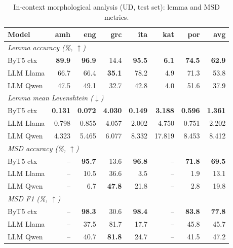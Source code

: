 \begin{table}[h]
\centering
\small
\setlength{\tabcolsep}{5pt}
\renewcommand{\arraystretch}{1.10}
\begin{tabular}{lrrrrrrr}
\toprule
Model & amh & eng & grc & ita & kat & por & avg \\
\midrule
\multicolumn{8}{l}{\textit{Lemma accuracy (\%, $\uparrow$)}} \\
ByT5 ctx & \textbf{89.9} & \textbf{96.9} & 14.4 & \textbf{95.5} & \textbf{6.1} & \textbf{74.5} & \textbf{62.9} \\
LLM Llama & 66.7 & 66.4 & \textbf{35.1} & 78.2 & 4.9 & 71.3 & 53.8 \\
LLM Qwen & 47.5 & 49.1 & 32.7 & 42.8 & 4.0 & 51.6 & 37.9 \\
\midrule
\multicolumn{8}{l}{\textit{Lemma mean Levenshtein ($\downarrow$)}} \\
ByT5 ctx & \textbf{0.131} & \textbf{0.072} & \textbf{4.030} & \textbf{0.149} & \textbf{3.188} & \textbf{0.596} & \textbf{1.361} \\
LLM Llama & 0.798 & 0.855 & 4.057 & 2.002 & 4.750 & 0.751 & 2.202 \\
LLM Qwen & 4.323 & 5.465 & 6.077 & 8.332 & 17.819 & 8.453 & 8.412 \\
\midrule
\multicolumn{8}{l}{\textit{\acs{MSD} accuracy (\%, $\uparrow$)}} \\
ByT5 ctx & -- & \textbf{95.7} & 13.6 & \textbf{96.8} & -- & \textbf{71.8} & \textbf{69.5} \\
LLM Llama & -- & 10.5 & 36.6 & 3.5 & -- & 1.9 & 13.1 \\
LLM Qwen & -- & 6.7 & \textbf{47.8} & 21.8 & -- & 2.8 & 19.8 \\
\midrule
\multicolumn{8}{l}{\textit{\acs{MSD} F1 (\%, $\uparrow$)}} \\
ByT5 ctx & -- & \textbf{98.3} & 30.6 & \textbf{98.4} & -- & \textbf{83.8} & \textbf{77.8} \\
LLM Llama & -- & 37.5 & 81.7 & 17.7 & -- & 45.8 & 45.7 \\
LLM Qwen & -- & 40.7 & \textbf{81.8} & 24.7 & -- & 41.5 & 47.2 \\
\bottomrule
\end{tabular}
\caption{In-context morphological analysis (UD, test set): lemma and \acs{MSD} metrics.}
\label{tab:results-analysis-ud-context-matrix}
\end{table}
